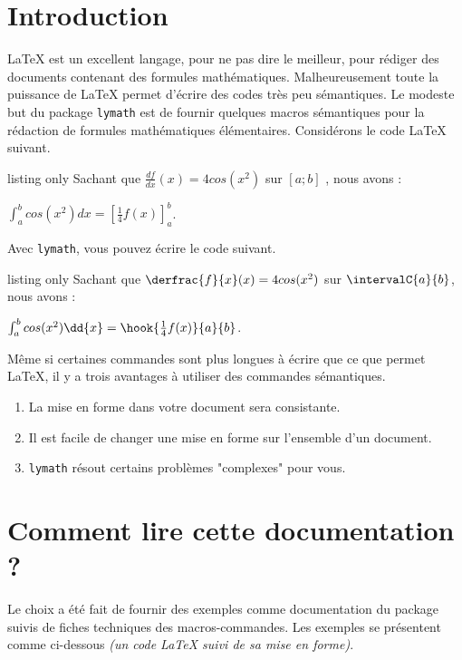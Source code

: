 \documentclass[12pt,a4paper]{article}
\begin{document}
\section{Introduction}

\LaTeX{} est un excellent langage, pour ne pas dire le meilleur, pour rédiger des documents contenant des formules mathématiques.
Malheureusement toute la puissance de \LaTeX{} permet d'écrire des codes très peu sémantiques.
Le modeste but du package \verb+lymath+ est de fournir quelques macros sémantiques pour la rédaction de formules mathématiques élémentaires. Considérons le code \LaTeX{} suivant.

\begin{tcblisting}{listing only}
Sachant que $\frac{df}{dx}(x) = 4 cos(x^2)$ sur $[a ; b]$ , nous avons :

$\int_a^b cos(x^2) dx = \left[ \frac{1}{4} f(x) \right]_a^b$.
\end{tcblisting}


Avec \verb+lymath+, vous pouvez écrire le code suivant.

\begin{tcblisting}{listing only}
Sachant que $\derfrac{f}{x}(x) = 4 cos(x^2)$ sur $\intervalC{a}{b}$, nous avons :

$\int_a^b cos(x^2) \dd{x} = \hook{\frac{1}{4} f(x)}{a}{b}$.
\end{tcblisting}


Même si certaines commandes sont plus longues à écrire que ce que permet \LaTeX{}, il y a trois avantages à utiliser des commandes sémantiques.
\begin{enumerate}
	\item La mise en forme dans votre document sera consistante.

	\item Il est facile de changer une mise en forme sur l'ensemble d'un document.

	\item \verb+lymath+ résout certains problèmes "complexes" pour vous.
\end{enumerate}



\section{Comment lire cette documentation ?}

Le choix a été fait de fournir des exemples comme documentation du package suivis de fiches techniques des macros-commandes. Les exemples se présentent comme ci-dessous \textit{(un code \LaTeX{} suivi de sa mise en forme)}.
\end{document}
